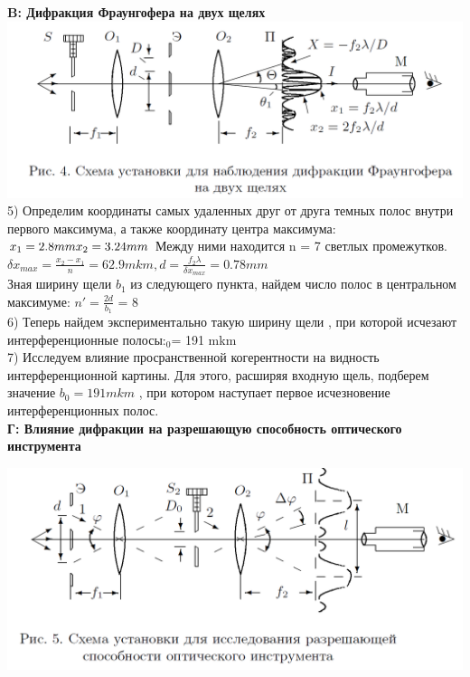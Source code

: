 \documentclass[a4paper,12pt]{article} %
\begin{document}
 
 
 
 
 \textbf{B: Дифракция Фраунгофера на двух щелях} \\
 \includegraphics[scale=0.5]{3}
5) Определим координаты самых удаленных друг от друга темных полос внутри
первого максимума, а также координату центра максимума:
$x_1=2.8 mm\\
x_2=3.24 mm\\
$ Между ними находится n = 7 светлых промежутков.\\

$\delta x_{max} = \frac{x_2-x_1}{n} = 62.9 mkm, d= \frac{f_2 \lambda}{\delta x_{max}}=0.78 mm$ \\
Зная ширину щели $b_1$ из следующего пункта, найдем число полос в центральном максимуме: $n'=\frac{2d}{b_1}$ = 8 \\
6) Теперь найдем экспериментально такую ширину щели , при которой исчезают
интерференционные полосы:$_0 $= 191 mkm\\
7) Исследуем влияние просранственной когерентности на видность интерференционной картины. Для этого, расширяя входную щель, подберем значение $b_0=191 mkm$ , при котором наступает первое исчезновение интерференционных полос.
\\


\newpage
\textbf{Г: Влияние дифракции на разрешающую способность оптического инструмента}	\\

\begin{center}

\includegraphics[scale=0.5]{4}

\end{center}
\end{document}
